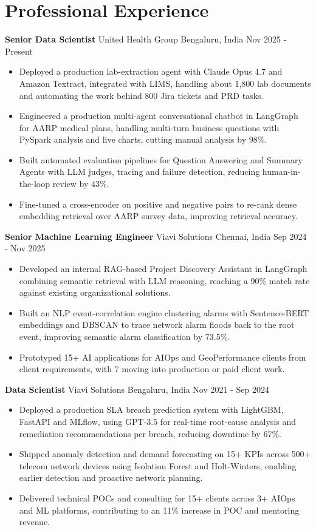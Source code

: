 \documentclass[10pt,a4paper]{article}
\newcommand{\role}[4]{\textbf{#1} \textbar{} #2 \hfill #3 \textbar{} #4\par}
\begin{document}
\section{Professional Experience}
\role{Senior Data Scientist}{United Health Group}{Bengaluru, India}{Nov 2025 - Present}
\begin{itemize}
  \item Deployed a production lab-extraction agent with Claude Opus 4.7 and Amazon Textract, integrated with LIMS, handling about 1,800 lab documents and automating the work behind 800 Jira tickets and PRD tasks.
  \item Engineered a production multi-agent conversational chatbot in LangGraph for AARP medical plans, handling multi-turn business questions with PySpark analysis and live charts, cutting manual analysis by 98\%.
  \item Built automated evaluation pipelines for Question Answering and Summary Agents with LLM judges, tracing and failure detection, reducing human-in-the-loop review by 43\%.
  \item Fine-tuned a cross-encoder on positive and negative pairs to re-rank dense embedding retrieval over AARP survey data, improving retrieval accuracy.
\end{itemize}
\vspace{3pt}
\role{Senior Machine Learning Engineer}{Viavi Solutions}{Chennai, India}{Sep 2024 - Nov 2025}
\begin{itemize}
  \item Developed an internal RAG-based Project Discovery Assistant in LangGraph combining semantic retrieval with LLM reasoning, reaching a 90\% match rate against existing organizational solutions.
  \item Built an NLP event-correlation engine clustering alarms with Sentence-BERT embeddings and DBSCAN to trace network alarm floods back to the root event, improving semantic alarm classification by 73.5\%.
  \item Prototyped 15+ AI applications for AIOps and GeoPerformance clients from client requirements, with 7 moving into production or paid client work.
\end{itemize}
\vspace{3pt}
\role{Data Scientist}{Viavi Solutions}{Bengaluru, India}{Nov 2021 - Sep 2024}
\begin{itemize}
  \item Deployed a production SLA breach prediction system with LightGBM, FastAPI and MLflow, using GPT-3.5 for real-time root-cause analysis and remediation recommendations per breach, reducing downtime by 67\%.
  \item Shipped anomaly detection and demand forecasting on 15+ KPIs across 500+ telecom network devices using Isolation Forest and Holt-Winters, enabling earlier detection and proactive network planning.
  \item Delivered technical POCs and consulting for 15+ clients across 3+ AIOps and ML platforms, contributing to an 11\% increase in POC and mentoring revenue.
\end{itemize}
\end{document}
